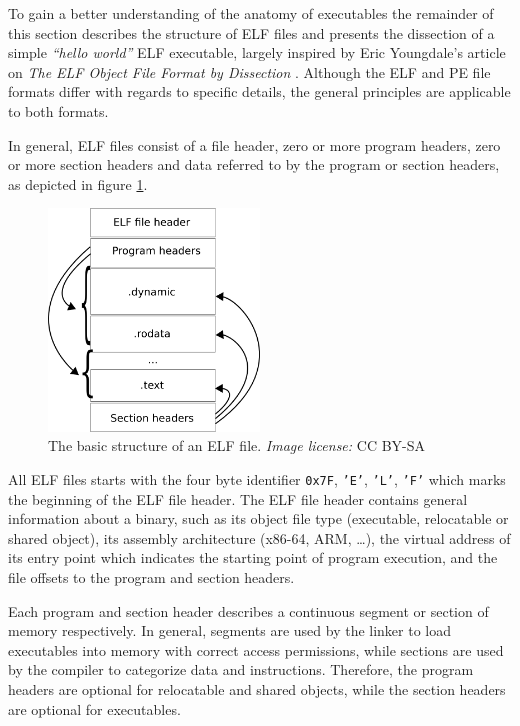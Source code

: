 To gain a better understanding of the anatomy of executables the remainder of this section describes the structure of ELF files and presents the dissection of a simple \textit{``hello world''} ELF executable, largely inspired by Eric Youngdale's article on \textit{The ELF Object File Format by Dissection} \cite{elf_dissection}. Although the ELF and PE file formats differ with regards to specific details, the general principles are applicable to both formats.

In general, ELF files consist of a file header, zero or more program headers, zero or more section headers and data referred to by the program or section headers, as depicted in figure \ref{fig:elf_file_structure}.

\begin{figure}[htbp]
	\begin{center}
		\includegraphics[width=0.5\textwidth]{inc/elf_file_structure.png}
		\caption{The basic structure of an ELF file. \textit{Image license:} CC BY-SA \cite{elf_structure_orig}}
		\label{fig:elf_file_structure}
	\end{center}
\end{figure}

All ELF files starts with the four byte identifier \texttt{0x7F}, \texttt{'E'}, \texttt{'L'}, \texttt{'F'} which marks the beginning of the ELF file header. The ELF file header contains general information about a binary, such as its object file type (executable, relocatable or shared object), its assembly architecture (x86-64, ARM, …), the virtual address of its entry point which indicates the starting point of program execution, and the file offsets to the program and section headers.

Each program and section header describes a continuous segment or section of memory respectively. In general, segments are used by the linker to load executables into memory with correct access permissions, while sections are used by the compiler to categorize data and instructions. Therefore, the program headers are optional for relocatable and shared objects, while the section headers are optional for executables.

